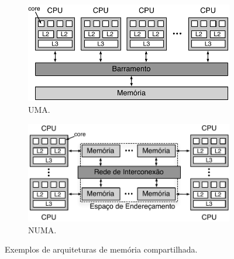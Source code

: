 \documentclass{SBCbookchapter}
\begin{document}
			\begin{figure}[t]
				\captionsetup[subfigure]{justification=centering}
				\centering
					\begin{subfigure}{0.45\linewidth}
						\includegraphics[width=\linewidth]{img/uma}
						\caption{UMA.}
					\end{subfigure}
					\quad\quad
					\begin{subfigure}{0.45\linewidth}
						\includegraphics[width=\linewidth]{img/numa}
						\caption{NUMA.}
					\end{subfigure}
				\caption{Exemplos de arquiteturas de memória compartilhada.}
				\label{fig:uma-numa}
			\end{figure}
\end{document}
